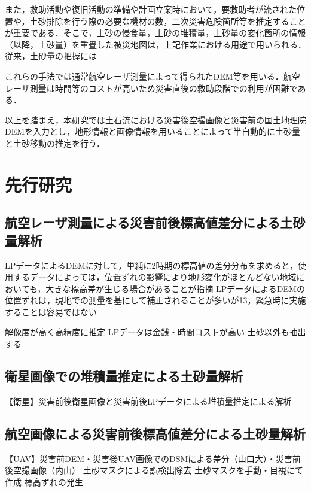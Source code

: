     また，救助活動や復旧活動の準備や計画立案時において，要救助者が流された位置や，土砂排除を行う際の必要な機材の数，二次災害危険箇所等を推定することが重要である．そこで，土砂の侵食量，土砂の堆積量，土砂量の変化箇所の情報（以降，土砂量）を重畳した被災地図は，上記作業における用途で用いられる．従来，土砂量の把握には




    これらの手法では通常航空レーザ測量によって得られたDEM等を用いる．航空レーザ測量は時間等のコストが高いため災害直後の救助段階での利用が困難である．

    以上を踏まえ，本研究では土石流における災害後空撮画像と災害前の国土地理院DEM\cite{基盤地図情報}を入力とし，地形情報と画像情報を用いることによって半自動的に土砂量と土砂移動の推定を行う．





  \section{先行研究}
    \subsection{航空レーザ測量による災害前後標高値差分による土砂量解析}
    LPデータによるDEMに対して，単純に2時期の標高値の差分分布を求めると，使用するデータによっては，位置ずれの影響により地形変化がほとんどない地域においても，大きな標高差が生じる場合があることが指摘
    LPデータによるDEMの位置ずれは，現地での測量を基にして補正されることが多いが13，緊急時に実施することは容易ではない

    解像度が高く高精度に推定
    LPデータは金銭・時間コストが高い
    土砂以外も抽出する


    \subsection{衛星画像での堆積量推定による土砂量解析}
      
    【衛星】災害前後衛星画像と災害前後LPデータによる堆積量推定による解析
  


    \subsection{航空画像による災害前後標高値差分による土砂量解析}
      
    【UAV】災害前DEM・災害後UAV画像でのDSMによる差分（山口大）・災害前後空撮画像（内山）
    土砂マスクによる誤検出除去
    土砂マスクを手動・目視にて作成
    標高ずれの発生

